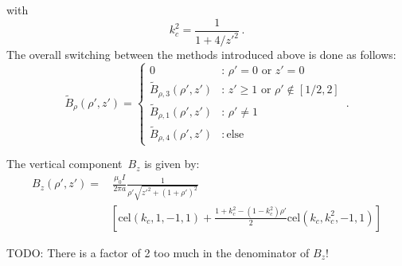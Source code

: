 with
\begin{equation}
  k_c^2 = \frac{1}{1 + 4/{z'}^2} \, .
\end{equation}
%
%
The overall switching between the methods introduced above is done as follows:
\begin{equation}
  \tilde{B}_\rho(\rho', z')
  = \begin{cases}
      0                                 &:\, \rho' = 0 \textrm{ or } z' = 0 \\
      \tilde{B}_{\rho,3} (\rho', z') &:\, z' \geq 1 \textrm{ or } \rho' \notin [1/2, 2] \\
      \tilde{B}_{\rho,1} (\rho', z') &:\, \rho' \neq 1         \\
      \tilde{B}_{\rho,4} (\rho', z') &:\, \textrm{else}
    \end{cases} \, .
\end{equation}

The vertical component~$B_z$ is given by:
\begin{align}
 B_z(\rho', z')
 =&\, \frac{\mu_0 I}{2 \pi a}
   \frac{1}{\rho' \sqrt{z'^2 + (1 + \rho')^2}} \nonumber \\
 ~& \left[
       \textrm{cel}(k_c, 1, -1, 1)
     + \frac{1 + k_c^2 - \left( 1 - k_c^2 \right) \rho'}{2} \textrm{cel}(k_c, k_c^2, -1, 1)
   \right]
\end{align}

{\color{red}
TODO: There is a factor of 2 too much in the denominator of $B_z$!
}

